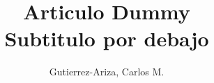 \documentclass[a4paper,12pt]{article}
\begin{document}
\title{Articulo Dummy \\ \large{Subtitulo por debajo}}
\author{Gutierrez-Ariza, Carlos M.}
\maketitle
\end{document}
